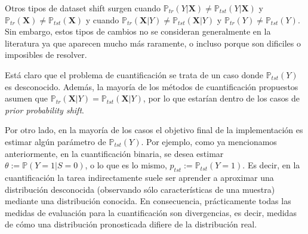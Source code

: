 Otros tipos de dataset shift surgen cuando $\mathbb{P}_{tr}(Y|\boldsymbol{X})
\neq \mathbb{P}_{tst}(Y|\boldsymbol{X})$ y $\mathbb{P}_{tr}(\boldsymbol{X}) \neq
\mathbb{P}_{tst}(\boldsymbol{X})$ y cuando $\mathbb{P}_{tr}(\boldsymbol{X}|Y)
\neq \mathbb{P}_{tst}(\boldsymbol{X}|Y)$ y $\mathbb{P}_{tr}(Y) \neq
\mathbb{P}_{tst}(Y)$. Sin embargo, estos tipos de cambios no se consideran
generalmente en la literatura ya que aparecen mucho más raramente, o incluso
porque son dificiles o imposibles de resolver.

Está claro que el problema de cuantificación se trata de un caso donde
$\mathbb{P}_{tst}(Y)$ es desconocido. Además, la mayoría de los métodos de
cuantificación propuestos asumen que $\mathbb{P}_{tr}(\boldsymbol{X}|Y) =
\mathbb{P}_{tst}(\boldsymbol{X}|Y)$, por lo que estarían dentro de los casos de
{\it prior probability shift}.

Por otro lado, en la mayoría de los casos el objetivo final de la implementación
es estimar algún parámetro de $\mathbb{P}_{tst}(Y)$. Por ejemplo, como ya
mencionamos anteriormente, en la cuantificación binaria, se desea estimar
$\theta:= \mathbb{P}(Y=1|S=0)$, o lo que es lo mismo, $p_{tst}:=
\mathbb{P}_{tst}(Y=1)$. Es decir, en la cuantificación la tarea indirectamente
suele ser aprender a aproximar una distribución desconocida (observando sólo
características de una muestra) mediante una distribución conocida. En
consecuencia, prácticamente todas las medidas de evaluación para la
cuantificación son divergencias, es decir, medidas de cómo una distribución
pronosticada difiere de la distribución real.

